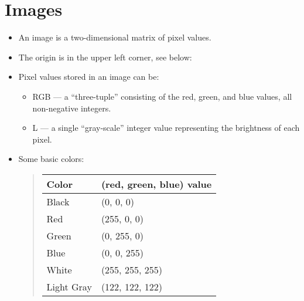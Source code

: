 \documentclass[letterpaper,10pt,english]{sphinxmanual}
\begin{document}
\section{Images}
\label{\detokenize{lecture_notes/lec07_modules_images:images}}\begin{itemize}
\item {} 
An image is a two-dimensional matrix of pixel values.

\item {} 
The origin is in the upper left corner, see below:

\noindent{}

\item {} 
Pixel values stored in an image can be:
\begin{itemize}
\item {} 
RGB — a “three-tuple” consisting of the red, green, and blue
values, all non-negative integers.

\item {} 
L — a single “gray-scale” integer value representing the
brightness of each pixel.

\end{itemize}

\item {} 
Some basic colors:
\begin{quote}


\begin{savenotes}\sphinxattablestart
\centering
\begin{tabulary}{\linewidth}[t]{|T|T|}
\hline
\sphinxstyletheadfamily 
Color
&\sphinxstyletheadfamily 
(red, green, blue) value
\\
\hline
Black
&
(0, 0, 0)
\\
\hline
Red
&
(255, 0, 0)
\\
\hline
Green
&
(0, 255, 0)
\\
\hline
Blue
&
(0, 0, 255)
\\
\hline
White
&
(255, 255, 255)
\\
\hline
Light Gray
&
(122, 122, 122)
\\
\hline
\end{tabulary}
\par
\sphinxattableend\end{savenotes}
\end{quote}

\end{itemize}
\end{document}
